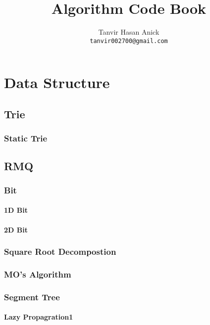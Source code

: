 \documentclass[11pt]{report}
\title{Algorithm Code Book}
\author{
  Tanvir Hasan Anick\\
  \texttt{tanvir002700@gmail.com}
}
\begin{document}
\maketitle
\tableofcontents
\newpage

\chapter{Data Structure}
\section{Trie}
\subsection{Static Trie}

\section{RMQ}
\subsection{Bit}
\subsubsection{1D Bit}

\subsubsection{2D Bit}

\subsection{Square Root Decompostion}

\subsection{MO's Algorithm}

\subsection{Segment Tree}
\subsubsection{Lazy Propagration1}

\end{document}
